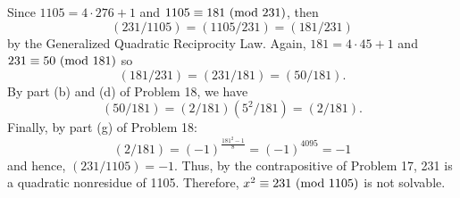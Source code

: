 \begin{solution}
    Since $1105 = 4\cdot 276 + 1$ and $1105 \equiv 181 \ (\mathrm{mod}\ 231)$, then
    $$(231/1105) = (1105/231) = (181/231)$$
    by the Generalized Quadratic Reciprocity Law. Again, $181 = 4 \cdot 45 + 1$ and $231 \equiv 50 \ (\mathrm{mod}\ 181)$ so 
    $$(181/231) = (231/181) = (50/181).$$
    By part (b) and (d) of Problem 18, we have
    $$(50/181) = (2/181)(5^2/181) = (2/181).$$
    Finally, by part (g) of Problem 18:
    $$(2/181) = (-1)^{\frac{181^2 - 1}{8}} = (-1)^{4095} = -1$$
    and hence, $(231/1105) = -1$. Thus, by the contrapositive of Problem 17, 231 is a quadratic nonresidue of 1105. Therefore, $x^2 \equiv 231 \ (\mathrm{mod}\ 1105)$ is not solvable. \\
\end{solution}